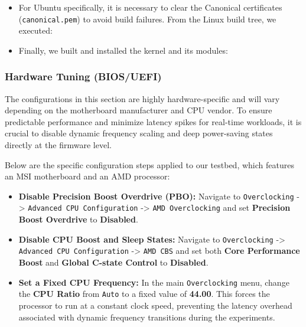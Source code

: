 \begin{itemize}
\item
  For Ubuntu specifically, it is necessary to clear the Canonical
  certificates (\texttt{canonical.pem}) to avoid build failures. From
  the Linux build tree, we executed:

\begin{Shaded}
\begin{Highlighting}[]
\end{Highlighting}
\end{Shaded}
\item
  Finally, we built and installed the kernel and its modules:

\begin{Shaded}
\begin{Highlighting}[]
\end{Highlighting}
\end{Shaded}
\end{itemize}

\subsubsection{Hardware Tuning
  (BIOS/UEFI)}\label{hardware-tuning-biosuefi}

The configurations in this section are highly hardware-specific and will
vary depending on the motherboard manufacturer and CPU vendor. To ensure
predictable performance and minimize latency spikes for real-time
workloads, it is crucial to disable dynamic frequency scaling and deep
power-saving states directly at the firmware level.

Below are the specific configuration steps applied to our testbed, which
features an MSI motherboard and an AMD processor:

\begin{itemize}
\item
  \textbf{Disable Precision Boost Overdrive (PBO):} Navigate to
  \texttt{Overclocking} -\textgreater{}
  \texttt{Advanced\ CPU\ Configuration} -\textgreater{}
  \texttt{AMD\ Overclocking} and set \textbf{Precision Boost Overdrive}
  to \textbf{Disabled}.
\item
  \textbf{Disable CPU Boost and Sleep States:} Navigate to
  \texttt{Overclocking} -\textgreater{}
  \texttt{Advanced\ CPU\ Configuration} -\textgreater{}
  \texttt{AMD\ CBS} and set both \textbf{Core Performance Boost} and
  \textbf{Global C-state Control} to \textbf{Disabled}.
\item
  \textbf{Set a Fixed CPU Frequency:} In the main \texttt{Overclocking}
  menu, change the \textbf{CPU Ratio} from \texttt{Auto} to a fixed
  value of \textbf{44.00}. This forces the processor to run at a
  constant clock speed, preventing the latency overhead associated with
  dynamic frequency transitions during the experiments.
\end{itemize}

